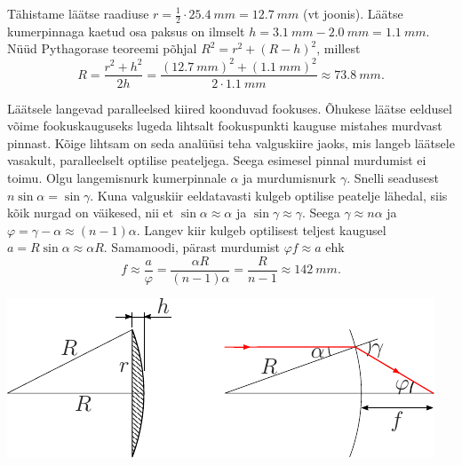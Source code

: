 \hint

\solu
\osa Tähistame läätse raadiuse $r=\frac{1}{2}\cdot \SI{25.4}{mm}=\SI{12.7}{mm}$ (vt joonis). Läätse kumerpinnaga kaetud osa paksus on ilmselt $h = \SI{3.1}{mm} - \SI{2.0}{mm} = \SI{1.1}{mm}$. Nüüd Pythagorase teoreemi põhjal $R^2 = r^2 + (R - h)^2$, millest
\[
R = \frac{r^2 + h^2}{2h} = \frac{(\SI{12.7}{mm})^2 + (\SI{1.1}{mm})^2}{2\cdot \SI{1.1}{mm}}\approx \SI{73.8}{mm}.
\]

\osa Läätsele langevad paralleelsed kiired koonduvad fookuses. Õhukese läätse eeldusel võime fookuskauguseks lugeda lihtsalt fookuspunkti kauguse mistahes murdvast pinnast. Kõige lihtsam on seda analüüsi teha valguskiire jaoks, mis langeb läätsele vasakult, paralleelselt optilise peateljega. Seega esimesel pinnal murdumist ei toimu. Olgu langemisnurk kumerpinnale $\alpha$ ja murdumisnurk $\gamma$. Snelli seadusest $n\sin\alpha=\sin\gamma$. Kuna valguskiir eeldatavasti kulgeb optilise peatelje lähedal, siis kõik nurgad on väikesed, nii et $\sin\alpha\approx\alpha$ ja $\sin\gamma\approx\gamma$. Seega $\gamma\approx n\alpha$ ja $\varphi=\gamma-\alpha\approx(n-1)\alpha$. Langev kiir kulgeb optilisest teljest kaugusel $a=R\sin\alpha\approx \alpha R$. Samamoodi, pärast murdumist $\varphi f\approx a$ ehk
\[
f\approx\frac{a}{\varphi}=\frac{\alpha R}{(n-1)\alpha}=\frac{R}{n-1}\approx \SI{142}{mm}.
\]

\begin{center}
  \includegraphics{2023-lahg-08-sol.pdf}
\end{center}
\probend